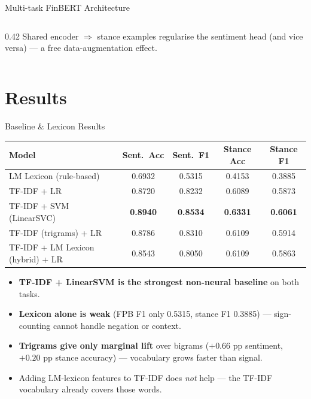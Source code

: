 \documentclass[10pt, aspectratio=169]{beamer}
\begin{document}
\begin{frame}{Multi-task FinBERT Architecture}
\begin{columns}[T]
\begin{column}{0.42\textwidth}
            \vspace{0.3em}
            {\small Shared encoder $\Rightarrow$ stance examples regularise the sentiment head (and vice versa) --- a free data-augmentation effect.}
        \end{column}
    \end{columns}
\end{frame}

\section{Results}

\begin{frame}{Baseline \& Lexicon Results}
    \centering
    {\small
    \begin{tabular}{lcccc}
        \toprule
        \textbf{Model} & \textbf{Sent.\ Acc} & \textbf{Sent.\ F1} & \textbf{Stance Acc} & \textbf{Stance F1} \\
        \midrule
        LM Lexicon (rule-based)~\cite{loughran2011liability} & 0.6932 & 0.5315 & 0.4153 & 0.3885 \\
        TF-IDF + LR                                           & 0.8720 & 0.8232 & 0.6089 & 0.5873 \\
        \rowcolor{UNSWYellow!30}
        TF-IDF + SVM (LinearSVC)                              & \textbf{0.8940} & \textbf{0.8534} & \textbf{0.6331} & \textbf{0.6061} \\
        TF-IDF (trigrams) + LR                                & 0.8786 & 0.8310 & 0.6109 & 0.5914 \\
        TF-IDF + LM Lexicon (hybrid) + LR                     & 0.8543 & 0.8050 & 0.6109 & 0.5863 \\
        \bottomrule
    \end{tabular}
    }

    \vspace{0.6em}
    \begin{itemize}\setlength{\itemsep}{1pt}
        \item \textbf{TF-IDF + LinearSVM is the strongest non-neural baseline} on both tasks.
        \item \textbf{Lexicon alone is weak} (FPB F1 only 0.5315, stance F1 0.3885) --- sign-counting cannot handle negation or context.
        \item \textbf{Trigrams give only marginal lift} over bigrams ($+0.66$ pp sentiment, $+0.20$ pp stance accuracy) --- vocabulary grows faster than signal.
        \item Adding LM-lexicon features to TF-IDF does \textit{not} help --- the TF-IDF vocabulary already covers those words.
    \end{itemize}
\end{frame}
\end{document}
